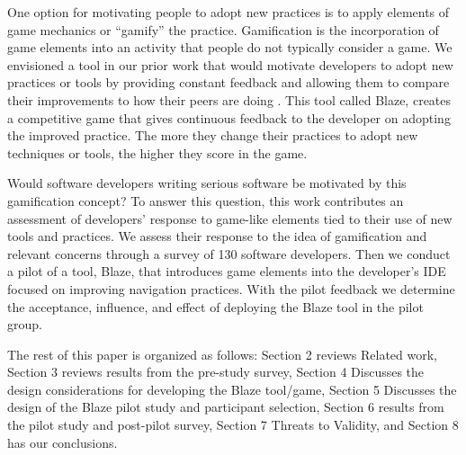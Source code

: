 \documentclass{sig-alternate}
\begin{document}
One option for motivating people to adopt new practices is to apply elements of game mechanics or ``gamify'' the practice. Gamification is the incorporation of game elements into an activity that people do not typically consider a game\cite{2013Oxford}.  We envisioned a tool in our prior work that would motivate developers to adopt new practices or tools by providing constant feedback and allowing them to compare their improvements to how their peers are doing  \cite{Snipes2013Towards}.  This tool called Blaze, creates a competitive game that gives continuous feedback to the developer on adopting the improved practice.  The more they change their practices to adopt new techniques or tools, the higher they score in the game. 

Would software developers writing serious software be motivated by this gamification concept? To answer this question, this work contributes an assessment of developers' response to game-like elements tied to their use of new tools and practices.  We assess their response to the idea of gamification and relevant concerns through a survey of 130 software developers.  Then we conduct a pilot of a tool, Blaze, that introduces game elements into the developer's IDE focused on improving navigation practices.  With the pilot feedback we determine the acceptance, influence, and effect of deploying the Blaze tool in the pilot group.

The rest of this paper is organized as follows:  Section 2 reviews Related work, Section 3 reviews results from the pre-study survey, Section 4 Discusses the design considerations for developing the Blaze tool/game, Section 5 Discusses the design of the Blaze pilot study and participant selection,  Section 6 results from the pilot study and post-pilot survey, Section 7 Threats to Validity, and Section 8 has our conclusions.
%
%
%
\end{document}
